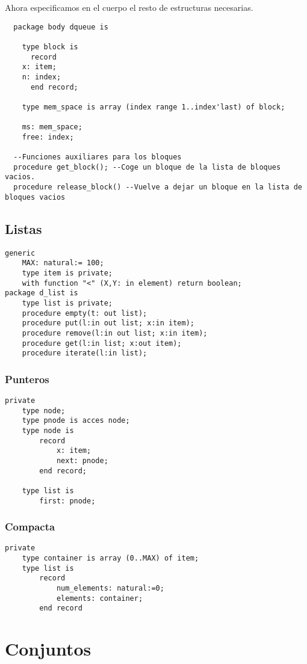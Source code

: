 \documentclass[a4paper,10pt]{book}
\begin{document}
Ahora especificamos en el cuerpo el resto de estructuras necesarias.
  
  \begin{lstlisting}
  package body dqueue is
  
    type block is
      record
	x: item;
	n: index;
      end record;
      
    type mem_space is array (index range 1..index'last) of block;
    
    ms: mem_space;
    free: index;
    
  --Funciones auxiliares para los bloques
  procedure get_block(); --Coge un bloque de la lista de bloques vacios.
  procedure release_block() --Vuelve a dejar un bloque en la lista de bloques vacios
\end{lstlisting}

\section{Listas}
\begin{lstlisting}
generic
	MAX: natural:= 100;
	type item is private;
	with function "<" (X,Y: in element) return boolean;
package d_list is
	type list is private;
	procedure empty(t: out list);
	procedure put(l:in out list; x:in item);
	procedure remove(l:in out list; x:in item);
	procedure get(l:in list; x:out item);
	procedure iterate(l:in list);
\end{lstlisting}

\subsection{Punteros}	
\begin{lstlisting}
private
	type node;
	type pnode is acces node;
	type node is
		record
			x: item;
			next: pnode;
		end record;
		
	type list is
		first: pnode;
\end{lstlisting}

\subsection{Compacta}	
\begin{lstlisting}
private
	type container is array (0..MAX) of item;
	type list is
		record
			num_elements: natural:=0;
			elements: container;
		end record
\end{lstlisting}


\chapter{Conjuntos}
\end{document}
